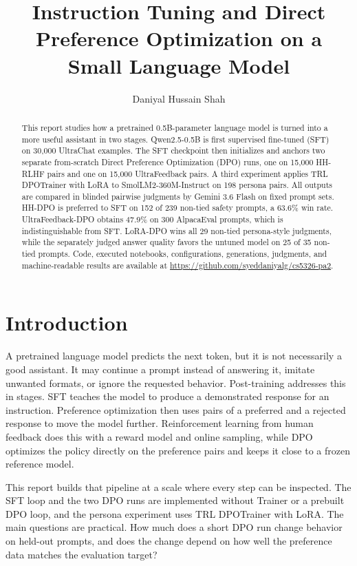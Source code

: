\documentclass{article}
\title{Instruction Tuning and Direct Preference Optimization on a Small Language Model}
\author{
  Daniyal Hussain Shah
}
\newcommand{\pct}{\%\xspace}
\begin{document}
\maketitle

\begin{abstract}
This report studies how a pretrained 0.5B-parameter language model is turned into a more useful assistant in two stages. Qwen2.5-0.5B is first supervised fine-tuned (SFT) on 30,000 UltraChat examples. The SFT checkpoint then initializes and anchors two separate from-scratch Direct Preference Optimization (DPO) runs, one on 15,000 HH-RLHF pairs and one on 15,000 UltraFeedback pairs. A third experiment applies TRL DPOTrainer with LoRA to SmolLM2-360M-Instruct on 198 persona pairs. All outputs are compared in blinded pairwise judgments by Gemini 3.6 Flash on fixed prompt sets. HH-DPO is preferred to SFT on 152 of 239 non-tied safety prompts, a 63.6\pct win rate. UltraFeedback-DPO obtains 47.9\pct on 300 AlpacaEval prompts, which is indistinguishable from SFT. LoRA-DPO wins all 29 non-tied persona-style judgments, while the separately judged answer quality favors the untuned model on 25 of 35 non-tied prompts. Code, executed notebooks, configurations, generations, judgments, and machine-readable results are available at \url{https://github.com/syeddaniyalg/cs5326-pa2}.
\end{abstract}

\section{Introduction}

A pretrained language model predicts the next token, but it is not necessarily a good assistant. It may continue a prompt instead of answering it, imitate unwanted formats, or ignore the requested behavior. Post-training addresses this in stages. SFT teaches the model to produce a demonstrated response for an instruction. Preference optimization then uses pairs of a preferred and a rejected response to move the model further. Reinforcement learning from human feedback does this with a reward model and online sampling, while DPO optimizes the policy directly on the preference pairs and keeps it close to a frozen reference model.

This report builds that pipeline at a scale where every step can be inspected. The SFT loop and the two DPO runs are implemented without Trainer or a prebuilt DPO loop, and the persona experiment uses TRL DPOTrainer with LoRA. The main questions are practical. How much does a short DPO run change behavior on held-out prompts, and does the change depend on how well the preference data matches the evaluation target?
\end{document}
